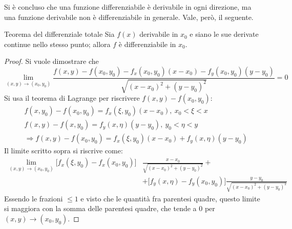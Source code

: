 \documentclass[10pt, a4paper]{scrartcl}
\theoremstyle{definition}
\numberwithin{esempio}{section}
\theoremstyle{definition}
\numberwithin{obs}{section}
\numberwithin{nota}{section}
\numberwithin{equation}{subsection}
\begin{document}
Si \`e concluso che una funzione differenziabile \`e derivabile in ogni direzione, ma una funzione derivabile non \`e differenziabile in generale. Vale, per\`o, il seguente.
\begin{teorema}
	{Teorema del differenziale totale}{}
	Sia $f(x)$ derivabile in $x_0$ e siano le sue derivate continue nello stesso punto; allora $f$ \`e differenziabile in $x_0$.
	\begin{proof}
		Si vuole dimostrare che
		\[
		\lim_{(x,y) \to (x_0,y_0)} \frac{f(x,y) - f(x_0,y_0) - f_x(x_0,y_0) (x-x_0) - f_y(x_0,y_0)(y-y_0)}{\sqrt{(x-x_0)^2 + (y-y_0)^2} } = 0
		\] 
		Si usa il teorema di Lagrange per riscrivere $f(x,y) - f(x_0,y_0)$:
		\[
		\begin{split}
			&f(x,y_0) - f(x_0,y_0) = f_x(\xi ,y_0) (x-x_0),\ x_0<\xi <x\\
			&f(x,y) - f(x,y_0) = f_y(x ,\eta) (y-y_0), \ y_0 < \eta < y\\
			&\Rightarrow f(x,y) - f(x_0,y_0) = f_x(\xi ,y_0) (x-x_0) + f_y(x,\eta) (y-y_0)
		\end{split}
		\] 
	Il limite scritto sopra si riscrive come:
	\[
		\begin{split}
			\lim_{(x,y) \to (x_0,y_0)} \big[f_x(\xi ,y_0) - f_x(x_0,y_0)\big] &\frac{x-x_0}{\sqrt{(x-x_0)^2 + (y-y_0)^2} } + \\ 
											  &+\big[f_y(x,\eta) - f_y(x_0,y_0)\big] \frac{y-y_0}{\sqrt{(x-x_0)^2 + (y-y_0)^2} }
		\end{split}
	\] 
	Essendo le frazioni $\le 1$ e visto che le quantit\`a fra parentesi quadre, questo limite si maggiora con la somma delle parentesi quadre, che tende a $0$ per $(x,y) \to (x_0,y_0)$.
	\end{proof}
\end{teorema}
\end{document}
